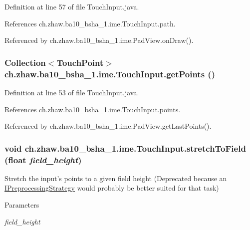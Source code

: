 Definition at line 57 of file TouchInput.java.

References ch.zhaw.ba10\_\-bsha\_\-1.ime.TouchInput.path.

Referenced by ch.zhaw.ba10\_\-bsha\_\-1.ime.PadView.onDraw().\hypertarget{classch_1_1zhaw_1_1ba10__bsha__1_1_1ime_1_1TouchInput_a12f25294b93d8e24ab3186f2c3e8e1b9}{
\subsubsection[{getPoints}]{\setlength{\rightskip}{0pt plus 5cm}Collection$<${\bf TouchPoint}$>$ ch.zhaw.ba10\_\-bsha\_\-1.ime.TouchInput.getPoints ()}}
\label{classch_1_1zhaw_1_1ba10__bsha__1_1_1ime_1_1TouchInput_a12f25294b93d8e24ab3186f2c3e8e1b9}


Definition at line 53 of file TouchInput.java.

References ch.zhaw.ba10\_\-bsha\_\-1.ime.TouchInput.points.

Referenced by ch.zhaw.ba10\_\-bsha\_\-1.ime.PadView.getLastPoints().\hypertarget{classch_1_1zhaw_1_1ba10__bsha__1_1_1ime_1_1TouchInput_ae2b9a9c1de66611330905b922310cc7c}{
\subsubsection[{stretchToField}]{\setlength{\rightskip}{0pt plus 5cm}void ch.zhaw.ba10\_\-bsha\_\-1.ime.TouchInput.stretchToField (float {\em field\_\-height})}}
\label{classch_1_1zhaw_1_1ba10__bsha__1_1_1ime_1_1TouchInput_ae2b9a9c1de66611330905b922310cc7c}
Stretch the input's points to a given field height (Deprecated because an \hyperlink{}{IPreprocessingStrategy} would probably be better suited for that task)


\begin{DoxyParams}{Parameters}
\item[{\em field\_\-height}]\end{DoxyParams}


